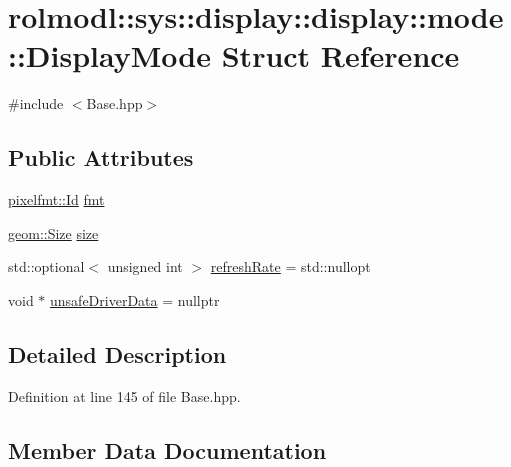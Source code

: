 \hypertarget{structrolmodl_1_1sys_1_1display_1_1display_1_1mode_1_1_display_mode}{}\section{rolmodl\+::sys\+::display\+::display\+::mode\+::Display\+Mode Struct Reference}
\label{structrolmodl_1_1sys_1_1display_1_1display_1_1mode_1_1_display_mode}


{\ttfamily \#include $<$Base.\+hpp$>$}

\subsection*{Public Attributes}
\begin{DoxyCompactItemize}
\item 
\mbox{\hyperlink{namespacerolmodl_1_1pixelfmt_a96282713e4465ba9211c8fd3a702b52b}{pixelfmt\+::\+Id}} \mbox{\hyperlink{structrolmodl_1_1sys_1_1display_1_1display_1_1mode_1_1_display_mode_a1a52a8c30433253b206d60405e4647b1}{fmt}}
\item 
\mbox{\hyperlink{structrolmodl_1_1geom_1_1_size}{geom\+::\+Size}} \mbox{\hyperlink{structrolmodl_1_1sys_1_1display_1_1display_1_1mode_1_1_display_mode_a99daf2477e4973cc72e59b5c4929ee6f}{size}}
\item 
std\+::optional$<$ unsigned int $>$ \mbox{\hyperlink{structrolmodl_1_1sys_1_1display_1_1display_1_1mode_1_1_display_mode_a627d32b64165d8264767e9a7e7f9dcc7}{refresh\+Rate}} = std\+::nullopt
\item 
void $\ast$ \mbox{\hyperlink{structrolmodl_1_1sys_1_1display_1_1display_1_1mode_1_1_display_mode_a7979bb680b51acbaa5b83dfcb5877110}{unsafe\+Driver\+Data}} = nullptr
\end{DoxyCompactItemize}


\subsection{Detailed Description}


Definition at line 145 of file Base.\+hpp.



\subsection{Member Data Documentation}
\mbox{\label{structrolmodl_1_1sys_1_1display_1_1display_1_1mode_1_1_display_mode_a1a52a8c30433253b206d60405e4647b1}} 
